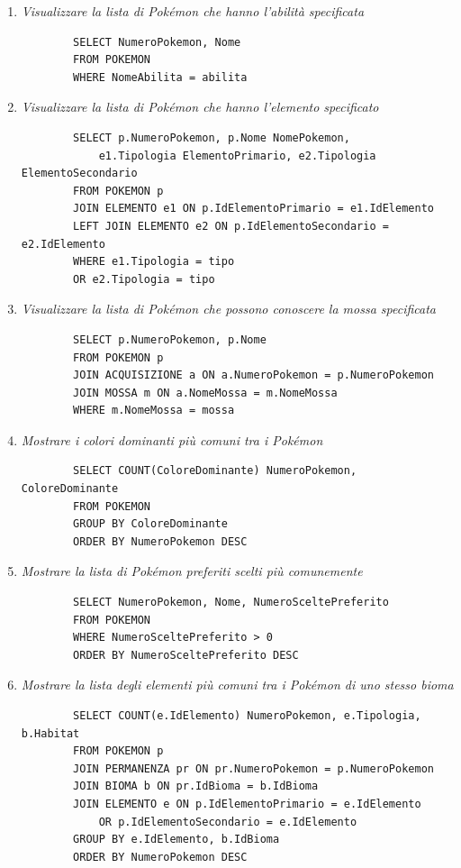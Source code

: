 \documentclass[a4paper,12pt]{report}
\begin{document}
\begin{enumerate}
	\item \textit{Visualizzare la lista di Pokémon che hanno l'abilità specificata}
	\begin{verbatim}
		SELECT NumeroPokemon, Nome
		FROM POKEMON
		WHERE NomeAbilita = abilita
	\end{verbatim}
	
	\item \textit{Visualizzare la lista di Pokémon che hanno l'elemento specificato}
	\begin{verbatim}
		SELECT p.NumeroPokemon, p.Nome NomePokemon,
			e1.Tipologia ElementoPrimario, e2.Tipologia ElementoSecondario
		FROM POKEMON p
		JOIN ELEMENTO e1 ON p.IdElementoPrimario = e1.IdElemento
		LEFT JOIN ELEMENTO e2 ON p.IdElementoSecondario = e2.IdElemento
		WHERE e1.Tipologia = tipo
   		OR e2.Tipologia = tipo
	\end{verbatim}
	
	\item \textit{Visualizzare la lista di Pokémon che possono conoscere la mossa specificata}
	\begin{verbatim}
		SELECT p.NumeroPokemon, p.Nome
		FROM POKEMON p
		JOIN ACQUISIZIONE a ON a.NumeroPokemon = p.NumeroPokemon
		JOIN MOSSA m ON a.NomeMossa = m.NomeMossa
		WHERE m.NomeMossa = mossa
	\end{verbatim}
	
	\item \textit{Mostrare i colori dominanti più comuni tra i Pokémon}
	\begin{verbatim}
		SELECT COUNT(ColoreDominante) NumeroPokemon, ColoreDominante
		FROM POKEMON
		GROUP BY ColoreDominante
		ORDER BY NumeroPokemon DESC
	\end{verbatim}	
	
	\item \textit{Mostrare la lista di Pokémon preferiti scelti più comunemente}
	\begin{verbatim}
		SELECT NumeroPokemon, Nome, NumeroSceltePreferito
		FROM POKEMON
		WHERE NumeroSceltePreferito > 0
		ORDER BY NumeroSceltePreferito DESC
	\end{verbatim}
	
	\item \textit{Mostrare la lista degli elementi più comuni tra i Pokémon di uno stesso bioma}
	\begin{verbatim}
		SELECT COUNT(e.IdElemento) NumeroPokemon, e.Tipologia, b.Habitat
		FROM POKEMON p
		JOIN PERMANENZA pr ON pr.NumeroPokemon = p.NumeroPokemon
		JOIN BIOMA b ON pr.IdBioma = b.IdBioma
		JOIN ELEMENTO e ON p.IdElementoPrimario = e.IdElemento
			OR p.IdElementoSecondario = e.IdElemento
		GROUP BY e.IdElemento, b.IdBioma
		ORDER BY NumeroPokemon DESC
	\end{verbatim}
	

\end{enumerate}
\end{document}
